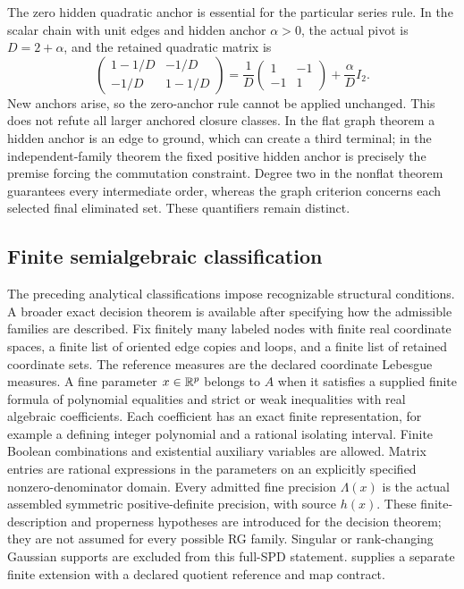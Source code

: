The zero hidden quadratic anchor is essential for the particular series
rule. In the scalar chain with unit edges and hidden anchor
\(\alpha>0\), the actual pivot is \(D=2+\alpha\), and the retained
quadratic matrix is
\begin{equation}
\begin{pmatrix}1-1/D&-1/D\\-1/D&1-1/D\end{pmatrix}
=\frac1D\begin{pmatrix}1&-1\\-1&1\end{pmatrix}
+\frac{\alpha}{D}I_2.
\label{eq:cg-nonflat-series-hidden-anchor-boundary}
\end{equation}
New anchors arise, so the zero-anchor rule cannot be applied
unchanged. This does not refute all larger anchored closure
classes. In the flat graph theorem a hidden anchor is an edge to
ground, which can create a third terminal; in the independent-family
theorem the fixed positive hidden anchor is precisely the premise
forcing the commutation constraint. Degree two in the nonflat
theorem guarantees every intermediate order, whereas the graph
criterion concerns each selected final eliminated set. These
quantifiers remain distinct. 

\subsection{Finite semialgebraic classification}
\label{sec:cg-semialgebraic-kron}

The preceding analytical classifications impose recognizable structural
conditions. A broader exact decision theorem is available after specifying
how the admissible families are described. Fix finitely many labeled
nodes with finite real coordinate spaces, a finite list of oriented edge
copies and loops, and a finite list of retained coordinate sets. The
reference measures are the declared coordinate Lebesgue measures. A fine
parameter \(x\in\mathbb R^p\) belongs to \(A\) when it satisfies a supplied finite
formula of polynomial equalities and strict or weak inequalities with
real algebraic coefficients. Each coefficient has an exact finite
representation, for example a defining integer polynomial and a rational
isolating interval. Finite Boolean combinations and existential auxiliary
variables are allowed. Matrix entries are rational expressions in the
parameters on an explicitly specified nonzero-denominator domain.
Every admitted fine precision \(\Lambda(x)\) is the actual assembled
symmetric positive-definite precision, with source \(h(x)\).
These finite-description and properness hypotheses are introduced for
the decision theorem; they are not assumed for every possible RG family.
Singular or rank-changing Gaussian supports are excluded from this
full-SPD statement.  supplies a
separate finite extension with a declared quotient reference and map
contract.

